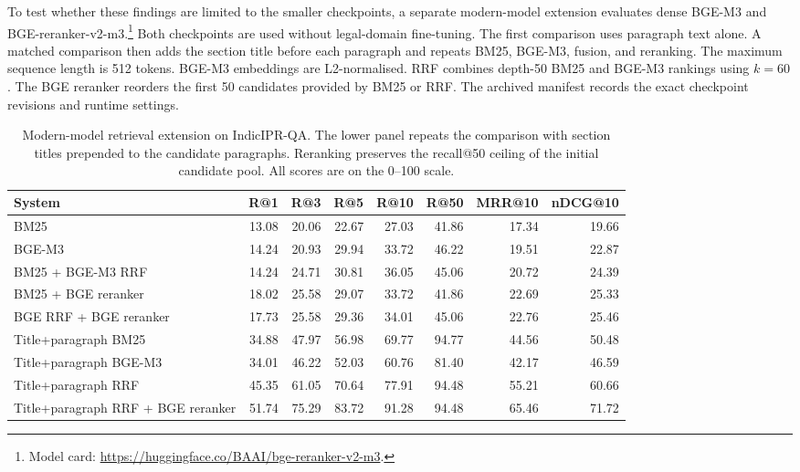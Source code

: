 \documentclass[pdflatex,sn-basic]{sn-jnl}%
\theoremstyle{thmstyleone}%
\theoremstyle{thmstyletwo}%
\theoremstyle{thmstylethree}%
\begin{document}
To test whether these findings are limited to the smaller checkpoints, a
separate modern-model extension evaluates dense BGE-M3
\citep{chenM3Embedding2024} and BGE-reranker-v2-m3.\footnote{Model card:
\url{https://huggingface.co/BAAI/bge-reranker-v2-m3}.}
Both checkpoints are used without legal-domain fine-tuning. The first
comparison uses paragraph text alone. A matched comparison then adds the
section title before each paragraph and repeats BM25, BGE-M3, fusion, and
reranking. The maximum sequence length is 512 tokens. BGE-M3 embeddings are
L2-normalised. RRF combines depth-50 BM25 and BGE-M3 rankings using $k=60$.
The BGE reranker reorders the first 50 candidates provided by BM25 or RRF.
The archived manifest records the exact checkpoint revisions and runtime
settings.

\begin{table}[!htbp]
    \caption{Modern-model retrieval extension on IndicIPR-QA. The lower panel
    repeats the comparison with section titles prepended to the candidate
    paragraphs. Reranking preserves the recall@50 ceiling of the initial
    candidate pool. All scores are on the 0--100 scale.}
    \label{tab:modern_bge_indic}
    \centering
    \scriptsize
    \renewcommand{\arraystretch}{0.93}
    \setlength{\tabcolsep}{1.3pt}
    \begin{tabular}{@{}lrrrrrrr@{}}
        \toprule
        System & R@1 & R@3 & R@5 & R@10 & R@50 & MRR@10 & nDCG@10 \\
        \midrule
        BM25 & 13.08 & 20.06 & 22.67 & 27.03 & 41.86 & 17.34 & 19.66 \\
        BGE-M3 & 14.24 & 20.93 & 29.94 & 33.72 & 46.22 & 19.51 & 22.87 \\
        BM25 + BGE-M3 RRF & 14.24 & 24.71 & 30.81 & 36.05 & 45.06 & 20.72 & 24.39 \\
        BM25 + BGE reranker & 18.02 & 25.58 & 29.07 & 33.72 & 41.86 & 22.69 & 25.33 \\
        BGE RRF + BGE reranker & 17.73 & 25.58 & 29.36 & 34.01 & 45.06 & 22.76 & 25.46 \\
        \midrule
        Title+paragraph BM25 & 34.88 & 47.97 & 56.98 & 69.77 & 94.77 & 44.56 & 50.48 \\
        Title+paragraph BGE-M3 & 34.01 & 46.22 & 52.03 & 60.76 & 81.40 & 42.17 & 46.59 \\
        Title+paragraph RRF & 45.35 & 61.05 & 70.64 & 77.91 & 94.48 & 55.21 & 60.66 \\
        Title+paragraph RRF + BGE reranker & 51.74 & 75.29 & 83.72 & 91.28 & 94.48 & 65.46 & 71.72 \\
        \bottomrule
    \end{tabular}
\end{table}
\end{document}
